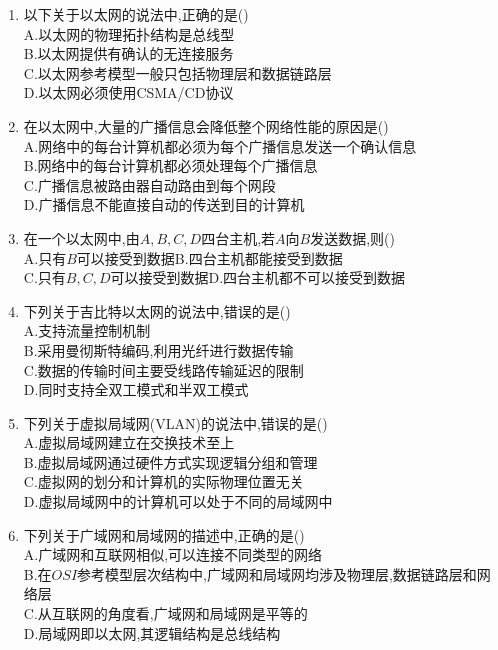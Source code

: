 \documentclass[12pt, a4paper, oneside, UTF8]{ctexbook}
\begin{document}
\begin{enumerate}
    \item 以下关于以太网的说法中,正确的是() \\
    A.以太网的物理拓扑结构是总线型 \\
    B.以太网提供有确认的无连接服务 \\
    C.以太网参考模型一般只包括物理层和数据链路层 \\
    D.以太网必须使用CSMA/CD协议

    \item 在以太网中,大量的广播信息会降低整个网络性能的原因是() \\
    A.网络中的每台计算机都必须为每个广播信息发送一个确认信息 \\
    B.网络中的每台计算机都必须处理每个广播信息 \\
    C.广播信息被路由器自动路由到每个网段 \\
    D.广播信息不能直接自动的传送到目的计算机 

    \item 在一个以太网中,由$A,B,C,D$四台主机,若$A$向$B$发送数据,则() \\
    A.只有$B$可以接受到数据\qquad B.四台主机都能接受到数据 \\
    C.只有$B,C,D$可以接受到数据\qquad D.四台主机都不可以接受到数据 

    \item 下列关于吉比特以太网的说法中,错误的是() \\
    A.支持流量控制机制 \\
    B.采用曼彻斯特编码,利用光纤进行数据传输 \\
    C.数据的传输时间主要受线路传输延迟的限制 \\
    D.同时支持全双工模式和半双工模式 
    
    \item 下列关于虚拟局域网(VLAN)的说法中,错误的是() \\
    A.虚拟局域网建立在交换技术至上 \\
    B.虚拟局域网通过硬件方式实现逻辑分组和管理\\
    C.虚拟网的划分和计算机的实际物理位置无关 \\
    D.虚拟局域网中的计算机可以处于不同的局域网中
    
    \item 下列关于广域网和局域网的描述中,正确的是() \\
    A.广域网和互联网相似,可以连接不同类型的网络 \\
    B.在$OSI$参考模型层次结构中,广域网和局域网均涉及物理层,数据链路层和网络层 \\
    C.从互联网的角度看,广域网和局域网是平等的 \\
    D.局域网即以太网,其逻辑结构是总线结构 


\end{enumerate}
\end{document}
